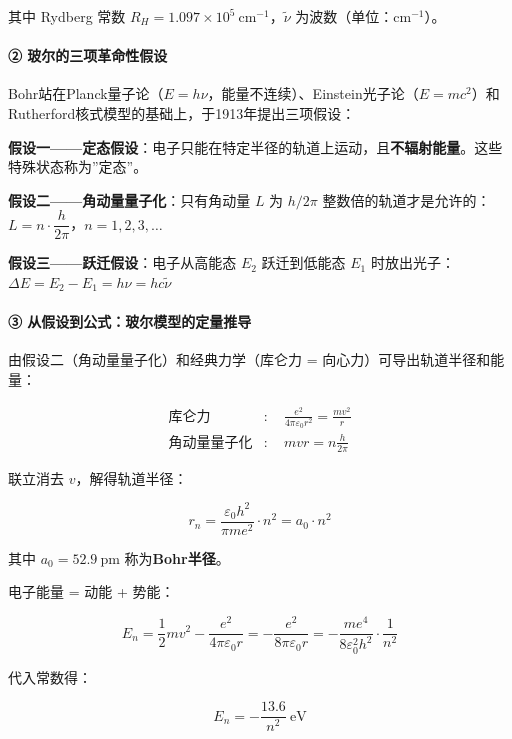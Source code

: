 \documentclass[a4paper,11pt]{ctexart}
\begin{document}
其中 Rydberg 常数 \(R_H = 1.097 \times 10^5\ \mathrm{cm^{-1}}\)，\(\tilde{\nu}\) 为波数（单位：\(\mathrm{cm^{-1}}\)）。

\paragraph{② 玻尔的三项革命性假设}\label{ux73bbux5c14ux7684ux4e09ux9879ux9769ux547dux6027ux5047ux8bbe}

Bohr站在Planck量子论（\(E = h\nu\)，能量不连续）、Einstein光子论（\(E = mc^2\)）和Rutherford核式模型的基础上，于1913年提出三项假设：

\textbf{假设一------定态假设}：电子只能在特定半径的轨道上运动，且\textbf{不辐射能量}。这些特殊状态称为''定态''。

\textbf{假设二------角动量量子化}：只有角动量 \(L\) 为 \(h/2\pi\) 整数倍的轨道才是允许的：\(L = n \cdot \dfrac{h}{2\pi}\)，\(n = 1,2,3,\dots\)

\textbf{假设三------跃迁假设}：电子从高能态 \(E_2\) 跃迁到低能态 \(E_1\) 时放出光子：\(\Delta E = E_2 - E_1 = h\nu = hc\tilde{\nu}\)

\paragraph{③ 从假设到公式：玻尔模型的定量推导}\label{ux4eceux5047ux8bbeux5230ux516cux5f0fux73bbux5c14ux6a21ux578bux7684ux5b9aux91cfux63a8ux5bfc}

由假设二（角动量量子化）和经典力学（库仑力 = 向心力）可导出轨道半径和能量：

\[
\begin{aligned}
\text{库仑力} &: \quad \frac{e^2}{4\pi\varepsilon_0 r^2} = \frac{mv^2}{r} \\
\text{角动量量子化} &: \quad mvr = n\frac{h}{2\pi}
\end{aligned}
\]

联立消去 \(v\)，解得轨道半径：

\[
r_n = \frac{\varepsilon_0 h^2}{\pi m e^2} \cdot n^2 = a_0 \cdot n^2
\]

其中 \(a_0 = 52.9\ \mathrm{pm}\) 称为\textbf{Bohr半径}。

电子能量 = 动能 + 势能：

\[
E_n = \frac{1}{2}mv^2 - \frac{e^2}{4\pi\varepsilon_0 r} = -\frac{e^2}{8\pi\varepsilon_0 r} = -\frac{me^4}{8\varepsilon_0^2 h^2} \cdot \frac{1}{n^2}
\]

代入常数得：

\[
\boxed{E_n = -\frac{13.6}{n^2}\ \mathrm{eV}}
\]
\end{document}
